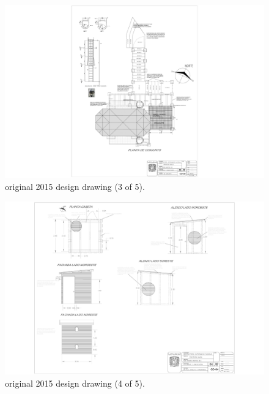 \begin{figure}
\begin{center}
\includegraphics[width=0.95\linewidth]{figures/buildings-coatli-drawing-2015-3.pdf}
\end{center}
\caption{{\projectname} original 2015 design drawing (3 of 5).}
\label{figure:buildings-drawing-2015-3}
\end{figure}

\begin{figure}
\begin{center}
\includegraphics[height=0.95\linewidth,angle=90]{figures/buildings-coatli-drawing-2015-4.pdf}
\end{center}
\caption{{\projectname} original 2015 design drawing (4 of 5).}
\label{figure:buildings-drawing-2015-4}
\end{figure}


